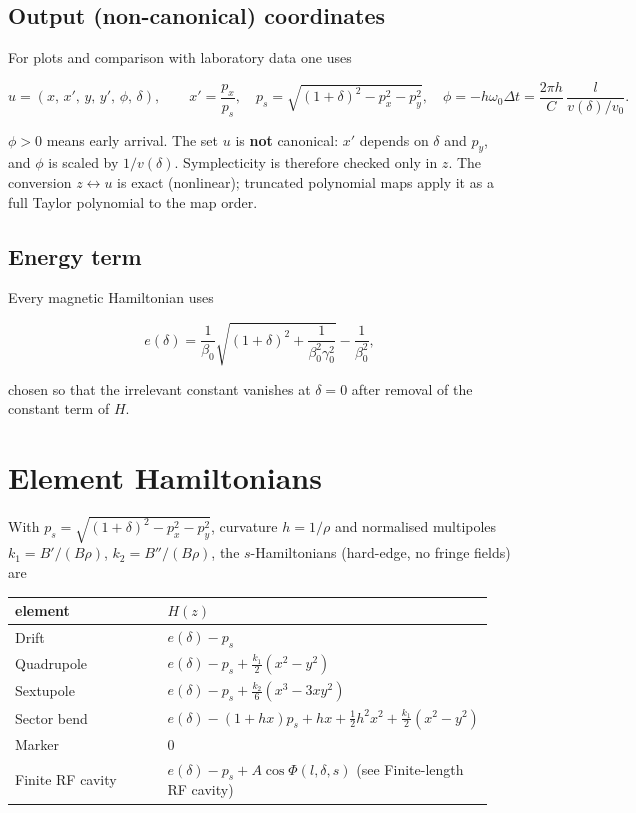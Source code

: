 \documentclass[11pt,a4paper]{article}
\begin{document}
\subsection{Output (non-canonical) coordinates}

For plots and comparison with laboratory data one uses

\[
u=(x,\,x',\,y,\,y',\,\phi,\,\delta),\qquad
x'=\frac{p_x}{p_s},\quad
p_s=\sqrt{(1+\delta)^2-p_x^2-p_y^2},\quad
\phi=-h\omega_0\Delta t=\frac{2\pi h}{C}\,\frac{l}{v(\delta)/v_0}.
\]

$\phi>0$ means early arrival. The set $u$ is \textbf{not} canonical:
$x'$ depends on $\delta$ and $p_y$, and $\phi$ is scaled by
$1/v(\delta)$. Symplecticity is therefore checked only in $z$. The
conversion $z\leftrightarrow u$ is exact (nonlinear); truncated polynomial
maps apply it as a full Taylor polynomial to the map order.

\subsection{Energy term}

Every magnetic Hamiltonian uses

\[
e(\delta)=\frac{1}{\beta_0}\sqrt{(1+\delta)^2+\frac{1}{\beta_0^2\gamma_0^2}}-\frac{1}{\beta_0^2},
\]

chosen so that the irrelevant constant vanishes at $\delta=0$ after removal
of the constant term of $H$.
\clearpage
\section{Element Hamiltonians}

With $p_s=\sqrt{(1+\delta)^2-p_x^2-p_y^2}$, curvature $h=1/\rho$ and
normalised multipoles $k_1=B'/(B\rho)$, $k_2=B''/(B\rho)$, the
$s$-Hamiltonians (hard-edge, no fringe fields) are

\begin{center}\small\begin{tabular}{p{0.475\linewidth}p{0.475\linewidth}}\hline
\textbf{element} & \textbf{$H(z)$}\\\hline
Drift & $e(\delta)-p_s$\\
Quadrupole & $e(\delta)-p_s+\tfrac{k_1}{2}(x^2-y^2)$\\
Sextupole & $e(\delta)-p_s+\tfrac{k_2}{6}(x^3-3xy^2)$\\
Sector bend & $e(\delta)-(1+hx)p_s+hx+\tfrac12 h^2 x^2+\tfrac{k_1}{2}(x^2-y^2)$\\
Marker & $0$\\
Finite RF cavity & $e(\delta)-p_s+A\cos\Phi(l,\delta,s)$ (see Finite-length RF cavity)\\
\hline\end{tabular}\end{center}
\end{document}
